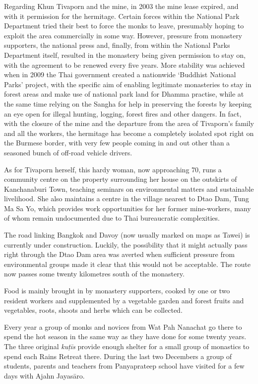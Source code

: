 Regarding Khun Tivaporn and the mine, in 2003 the mine lease expired, 
and with it permission for the hermitage. Certain forces within the
National Park Department tried their best to force the monks to leave, 
presumably hoping to exploit the area commercially in some way. However, 
pressure from monastery supporters, the national press and, finally, 
from within the National Parks Department itself, resulted in the
monastery being given permission to stay on, with the agreement to be
renewed every five years. More stability was achieved when in 2009 the
Thai government created a nationwide `Buddhist National Parks' project, 
with the specific aim of enabling legitimate monasteries to stay in
forest areas and make use of national park land for Dhamma practise, 
while at the same time relying on the Sangha for help in preserving the
forests by keeping an eye open for illegal hunting, logging, forest
fires and other dangers. In fact, with the closure of the mine and the
departure from the area of Tivaporn's family and all the workers, the
hermitage has become a completely isolated spot right on the Burmese
border, with very few people coming in and out other than a seasoned
bunch of off-road vehicle drivers. 

As for Tivaporn herself, this hardy woman, now approaching 70, runs a
community centre on the property surrounding her house on the outskirts
of Kanchanaburi Town, teaching seminars on environmental matters and
sustainable livelihood. She also maintains a centre in the village
nearest to Dtao Dam, Tung Ma Sa Yo, which provides work opportunities
for her former mine-workers, many of whom remain undocumented due to
Thai bureaucratic complexities. 

The road linking Bangkok and Davoy (now usually marked on maps as Tawei) 
is currently under construction. Luckily, the possibility that it might
actually pass right through the Dtao Dam area was averted when
sufficient pressure from environmental groups made it clear that this
would not be acceptable. The route now passes some twenty kilometres
south of the monastery. 

Food is mainly brought in by monastery supporters, cooked by one or two
resident workers and supplemented by a vegetable garden and forest
fruits and vegetables, roots, shoots and herbs which can be collected. 

Every year a group of monks and novices from Wat Pah Nanachat go there
to spend the hot season in the same way as they have done for some
twenty years. The three original \emph{kuṭīs} provide enough shelter for
a small group of monastics to spend each Rains Retreat there. During the
last two Decembers a group of students, parents and teachers from
Panyaprateep school have visited for a few days with Ajahn Jayasāro. 

